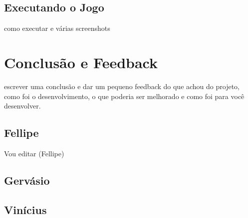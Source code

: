 \documentclass[a4paper]{article}
\begin{document}
\subsection{Executando o Jogo}
como executar e várias screenshots

\section{Conclusão e Feedback}
escrever uma conclusão e dar um pequeno feedback do que achou do projeto, como foi o desenvolvimento, o que poderia ser melhorado e como foi para você desenvolver.
\subsection{Fellipe}
Vou editar (Fellipe)
\subsection{Gervásio}
\subsection{Vinícius}
\end{document}
